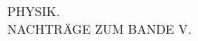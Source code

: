 \clearpage\begingroup\NoSourceHead{}
\begin{center}
\vspace*{2.5in}
{\Large PHYSIK.}\\[.45in]
{\large NACHTRÄGE ZUM BANDE V.}
\end{center}
\clearpage\endgroup
